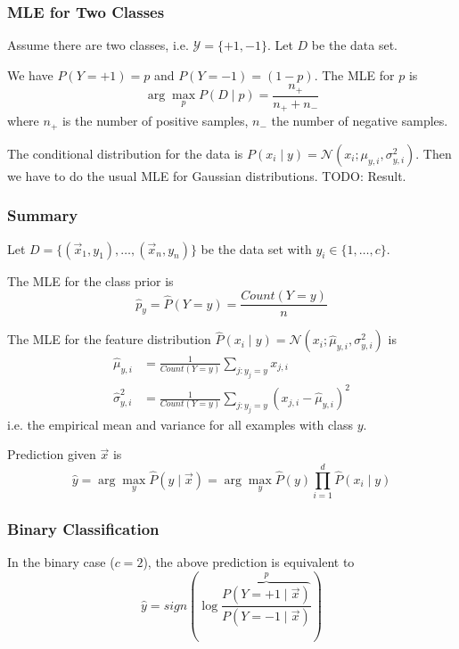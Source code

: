\subsubsection{MLE for Two Classes}
Assume there are two classes,
i.e. $\mathcal{Y} = \{+1, -1\}$.
Let $D$ be the data set.

We have $P(Y = +1) = p$ and
$P(Y = -1) = (1 - p)$.
The MLE for $p$ is
\begin{equation*}
    \arg\max_p{P(D \mid p)}
    = \frac{n_+}{n_+ + n_-}
\end{equation*}
where $n_+$ is the number of positive
samples, $n_-$ the number of negative
samples.

The conditional distribution for the
data is $P(x_i \mid y) = \mathcal{N}(x_i; \mu_{y, i}, \sigma^2_{y, i})$.
Then we have to do the usual MLE for
Gaussian distributions.
TODO: Result.

\subsubsection{Summary}
Let
$D = \{(\vec{x}_1, y_1), \dotsc, (\vec{x}_n, y_n)\}$
be the data set
with $y_i \in \{1, \dotsc, c\}$.

The MLE for the class prior is
\begin{equation*}
    \hat{p}_y = \hat{P}(Y = y)
    = \frac{Count(Y = y)}{n}
\end{equation*}

The MLE for the feature distribution
$\hat{P}(x_i \mid y) = \mathcal{N}(x_i; \hat{\mu}_{y, i}, \sigma^2_{y,i})$ is
\begin{align*}
    \hat{\mu}_{y,i} &=
    \frac{1}{Count(Y = y)}
    \sum_{j:y_j = y}{x_{j,i}} \\
    \hat{\sigma}^2_{y, i} &=
    \frac{1}{Count(Y = y)}
    \sum_{j:y_j = y}{(
        x_{j,i} - \hat{\mu}_{y,i}
    )^2}
\end{align*}
i.e. the empirical mean and variance
for all examples with class $y$.

Prediction given $\vec{x}$ is
\begin{equation*}
    \hat{y} = \arg\max_y{
        \hat{P}(y \mid \vec{x})
    }
    = \arg\max_y{
        \hat{P}(y)
        \prod_{i=1}^d{
            \hat{P}(x_i \mid y)
        }
    }
\end{equation*}

\subsubsection{Binary Classification}
In the binary case ($c = 2$),
the above prediction is equivalent to
\begin{equation*}
    \hat{y} = sign\left( \log{
    \frac{
    \overbrace{P(Y = +1 \mid \vec{x})}^p
    }
    {P(Y = -1 \mid \vec{x})}
    }\right)
\end{equation*}

